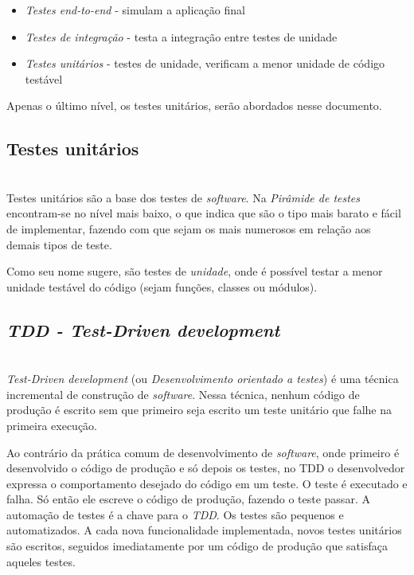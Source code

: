 \documentclass[times, twoside, watermark]{artigo}
\begin{document}
\begin{itemize}
  \item \textit{Testes end-to-end} - simulam a aplicação final
  \item \textit{Testes de integração} - testa a integração entre testes de unidade
  \item \textit{Testes unitários} - testes de unidade, verificam a menor unidade de
        código testável
\end{itemize}

Apenas o último nível, os testes unitários, serão abordados nesse documento.

\subsection{Testes unitários}\hfill\\

Testes unitários são a base dos testes de \textit{software}. Na \textit{Pirâmide de
  testes} encontram-se no nível mais baixo, o que indica que são
o tipo mais barato e fácil de implementar\cite{contan2018test},
fazendo com que sejam os mais numerosos em relação aos demais tipos de teste.

Como seu nome sugere, são testes de \textit{unidade}, onde é possível testar a
menor unidade testável do código (sejam funções, classes ou módulos).

\subsection{\textit{TDD - Test-Driven development}}\hfill\\

\textit{Test-Driven development} (ou \textit{Desenvolvimento orientado a testes}) é
uma técnica incremental de construção de \textit{software}.
Nessa técnica, nenhum código de produção é escrito sem que primeiro seja escrito um
teste unitário que falhe na primeira execução.

Ao contrário da prática comum de desenvolvimento de \textit{software}, onde primeiro
é desenvolvido o código de produção e só depois os testes, no TDD
o desenvolvedor expressa o comportamento desejado do código em um teste.
O teste é executado e falha. Só então ele escreve o código de produção, fazendo o
teste passar.
A automação de testes é a chave para o \textit{TDD}. Os testes são pequenos e
automatizados.
A cada nova funcionalidade implementada, novos testes unitários são escritos,
seguidos imediatamente por um código de produção que satisfaça aqueles testes.
\end{document}

